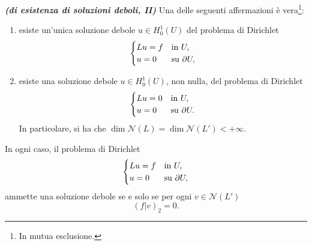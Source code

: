 \begin{teorema}\emph{\textbf{(di esistenza di soluzioni deboli, II)}}
	Una delle seguenti affermazioni è vera\footnote{In mutua esclusione.}:
	\begin{enumerate}[$(a)$]
		\item esiste un'unica soluzione debole $u \in H^1_0(U)$ del problema di Dirichlet
		\[ \begin{cases}
			Lu = f& \textup{in } U,\\
			u = 0 & \textup{su } \partial U,
		\end{cases} \]
		\item esiste una soluzione debole $u \in H^1_0(U)$, non nulla, del problema di Dirichlet
		\[ \begin{cases}
			Lu = 0 & \textup{in } U,\\
			u = 0 & \textup{su } \partial U.
		\end{cases} \]
		In particolare, si ha che $\dim{\mathcal{N}(L)} = \dim{\mathcal{N}(L')} < +\infty. $
	\end{enumerate}
	\par\noindent
	In ogni caso, il problema di Dirichlet
	\[ \begin{cases}
		Lu = f& \textup{in } U,\\
		u = 0 & \textup{su } \partial U,
	\end{cases} \]
	ammette una soluzione debole se e solo se per ogni $v \in \mathcal{N}(L')$
	\[ (f|v)_2 = 0. \]
\end{teorema}
